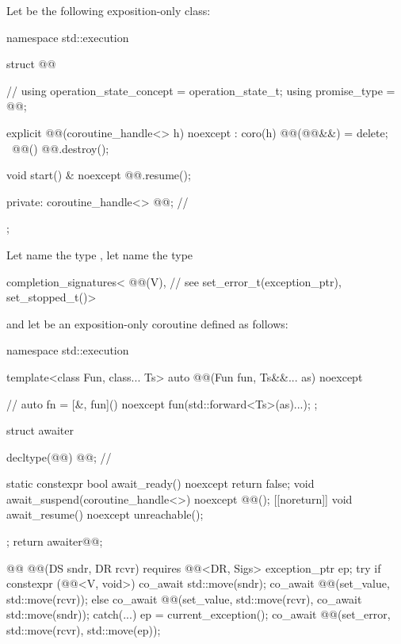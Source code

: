 \pnum
Let  be the following exposition-only class:
\begin{codeblock}
namespace std::execution {
  struct @@ {                              // \expos
    using operation_state_concept = operation_state_t;
    using promise_type = @@;

    explicit @@(coroutine_handle<> h) noexcept : coro(h) {}
    @@(@@&&) = delete;
    ~@@() { @@.destroy(); }

    void start() & noexcept {
      @@.resume();
    }

  private:
    coroutine_handle<> @@;                                    // \expos
  };
}
\end{codeblock}

\pnum
Let  name the type
,
let  name the type
\begin{codeblock}
completion_signatures<
  @@(V),         // see 
  set_error_t(exception_ptr),
  set_stopped_t()>
\end{codeblock}
and let  be an exposition-only coroutine
defined as follows:
\begin{codeblock}
namespace std::execution {
  template<class Fun, class... Ts>
  auto @@(Fun fun, Ts&&... as) noexcept {    // \expos
    auto fn = [&, fun]() noexcept { fun(std::forward<Ts>(as)...); };

    struct awaiter {
      decltype(@@) @@;                                     // \expos

      static constexpr bool await_ready() noexcept { return false; }
      void await_suspend(coroutine_handle<>) noexcept { @@(); }
      [[noreturn]] void await_resume() noexcept { unreachable(); }
    };
    return awaiter{@@};
  }

  @@ @@(DS sndr, DR rcvr) requires @@<DR, Sigs> {
    exception_ptr ep;
    try {
      if constexpr (@@<V, void>) {
        co_await std::move(sndr);
        co_await @@(set_value, std::move(rcvr));
      } else {
        co_await @@(set_value, std::move(rcvr), co_await std::move(sndr));
      }
    } catch(...) {
      ep = current_exception();
    }
    co_await @@(set_error, std::move(rcvr), std::move(ep));
  }
}
\end{codeblock}

